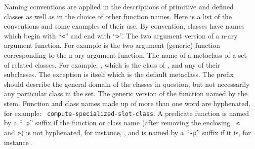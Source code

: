\begin{optDefinition}
Naming conventions are applied in the descriptions of primitive and
defined classes as well as in the choice of other function names.
Here is a list of the conventions and some examples of their use.
%
 By convention, classes have names
which begin with ``{\tt <}'' and end with ``{\tt >}''.
%
 The two argument version of a n-ary
argument function.  For example  is the two argument
(generic) function corresponding to the n-ary argument \functionref{+} function.
%
%
 The name of a metaclass of a set of
related classes.  For example, , which is the class of
,  and any of their
subclasses.  The exception is  itself which is the default
metaclass.  The prefix should describe the general domain of the classes in
question, but not necessarily any particular class in the set.
%
 The generic version of the function
named by the stem.
%
 Function and class names made up of more than one
word are hyphenated, for example: {\tt
    compute-specialized-slot-class}.
%
%
%
 A predicate function is named by a ``{\tt
    p}'' suffix if the function or class name (after removing the enclosing {\tt
    <} and {\tt >}) is not hyphenated, for instance, , and is
named by a ``{\tt -p}'' suffix if it is, for instance
.
%
%

\end{optDefinition}
